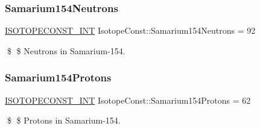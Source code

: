 \subsubsection{\texorpdfstring{Samarium154\+Neutrons}{Samarium154Neutrons}}
{\footnotesize\ttfamily \mbox{\hyperlink{group___isotope_const-_macros_ga5f18360b3e99483a35c32d789e62621c}{I\+S\+O\+T\+O\+P\+E\+C\+O\+N\+S\+T\+\_\+\+I\+NT}} Isotope\+Const\+::\+Samarium154\+Neutrons = 92}

\$ \$ Neutrons in Samarium-\/154. \mbox{\label{group___isotope_const-_samarium-_sm154_gaa9cb481d33fab3d28db29e30f3db6782}} 
\subsubsection{\texorpdfstring{Samarium154\+Protons}{Samarium154Protons}}
{\footnotesize\ttfamily \mbox{\hyperlink{group___isotope_const-_macros_ga5f18360b3e99483a35c32d789e62621c}{I\+S\+O\+T\+O\+P\+E\+C\+O\+N\+S\+T\+\_\+\+I\+NT}} Isotope\+Const\+::\+Samarium154\+Protons = 62}

\$ \$ Protons in Samarium-\/154. 